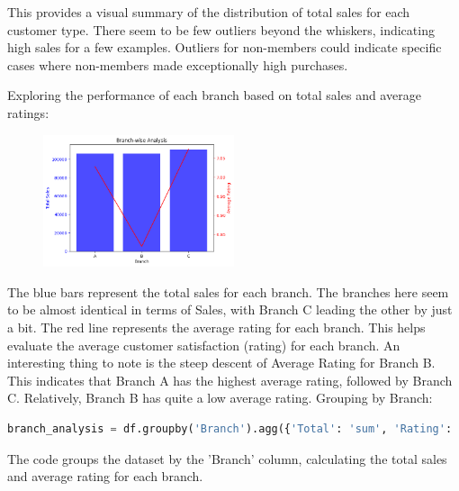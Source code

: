 This provides a visual summary of the distribution of total sales for each customer type. There seem to be few outliers beyond the whiskers, indicating high sales for a few examples. Outliers for non-members could indicate specific cases where non-members made exceptionally high purchases.



{Exploring the performance of each branch based on total sales and average ratings:}

\begin{figure}[h]
    \centering
    \includegraphics[width=0.5\textwidth]{Chapters/ch1/ch_1_barchart_2.png}
\end{figure}

The blue bars represent the total sales for each branch. The branches here seem to be almost identical in terms of Sales, with Branch C leading the other by just a bit.
The red line represents the average rating for each branch. This helps evaluate the average customer satisfaction (rating) for each branch. An interesting thing to note is the steep descent of Average Rating for Branch B. This indicates that Branch A has the highest average rating, followed by Branch C. Relatively, Branch B has quite a low average rating.
Grouping by Branch:
\begin{lstlisting}[language=Python, frame=none]
branch_analysis = df.groupby('Branch').agg({'Total': 'sum', 'Rating': 'mean'}).reset_index()
\end{lstlisting}
The code groups the dataset by the 'Branch' column, calculating the total sales and average rating for each branch.




